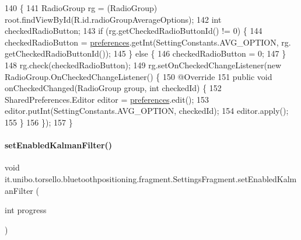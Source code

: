 \begin{DoxyCode}
140                                          \{
141         RadioGroup rg = (RadioGroup) root.findViewById(R.id.radioGroupAverageOptions);
142         \textcolor{keywordtype}{int} checkedRadioButton;
143         \textcolor{keywordflow}{if} (rg.getCheckedRadioButtonId() != 0) \{
144             checkedRadioButton = \hyperlink{classit_1_1unibo_1_1torsello_1_1bluetoothpositioning_1_1fragment_1_1SettingsFragment_a52480c4d5d81ca59fe4a98ae3c623ea4_a52480c4d5d81ca59fe4a98ae3c623ea4}{preferences}.getInt(SettingConstants.AVG\_OPTION, rg.
      getCheckedRadioButtonId());
145         \} \textcolor{keywordflow}{else} \{
146             checkedRadioButton = 0;
147         \}
148         rg.check(checkedRadioButton);
149         rg.setOnCheckedChangeListener(\textcolor{keyword}{new} RadioGroup.OnCheckedChangeListener() \{
150             @Override
151             \textcolor{keyword}{public} \textcolor{keywordtype}{void} onCheckedChanged(RadioGroup group, \textcolor{keywordtype}{int} checkedId) \{
152                 SharedPreferences.Editor editor = \hyperlink{classit_1_1unibo_1_1torsello_1_1bluetoothpositioning_1_1fragment_1_1SettingsFragment_a52480c4d5d81ca59fe4a98ae3c623ea4_a52480c4d5d81ca59fe4a98ae3c623ea4}{preferences}.edit();
153                 editor.putInt(SettingConstants.AVG\_OPTION, checkedId);
154                 editor.apply();
155             \}
156         \});
157     \}
\end{DoxyCode}
\hypertarget{classit_1_1unibo_1_1torsello_1_1bluetoothpositioning_1_1fragment_1_1SettingsFragment_ae16c093ba7bc137acf21dfc221cdcf56_ae16c093ba7bc137acf21dfc221cdcf56}{}\label{classit_1_1unibo_1_1torsello_1_1bluetoothpositioning_1_1fragment_1_1SettingsFragment_ae16c093ba7bc137acf21dfc221cdcf56_ae16c093ba7bc137acf21dfc221cdcf56} 
\paragraph{\texorpdfstring{set\+Enabled\+Kalman\+Filter()}{setEnabledKalmanFilter()}}
{\footnotesize\ttfamily void it.\+unibo.\+torsello.\+bluetoothpositioning.\+fragment.\+Settings\+Fragment.\+set\+Enabled\+Kalman\+Filter (\begin{DoxyParamCaption}\item[{int}]{progress }\end{DoxyParamCaption})\hspace{0.3cm}{\ttfamily [private]}}


